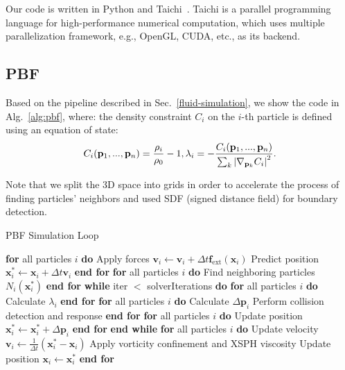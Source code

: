 \documentclass[sigconf]{acmart}
\begin{document}
Our code is written in Python and Taichi~\cite{hu2019taichi, hu2019difftaichi, hu2021quantaichi}. Taichi is a parallel programming language for high-performance numerical computation, which uses multiple parallelization framework, e.g., OpenGL, CUDA, etc., as its backend.

\subsection{PBF}
Based on the pipeline described in Sec.~\ref{fluid-simulation}, we show the code in Alg.~\ref{alg:pbf}, where:
the density constraint $C_i$ on the $i$-th particle is defined using an equation of state: 
 \begin{equation}
     C_{i}(\mathbf{p}_{1},...,\mathbf{p}_{n})=\frac{\rho_{i}}{\rho_{0}}-1, \\
     \lambda_{i}=-\frac{C_{i}(\mathbf{p}_{1},...,\mathbf{p}_{n})}{\sum_{k}\left|\nabla_{{\mathbf{p}_{k}}}C_{i}\right|^{2}}.
 \end{equation}
 
Note that we split the 3D space into grids in order to accelerate the process of finding particles' neighbors and used SDF (signed distance field) for boundary detection.
\begin{algorithm}
\caption{PBF Simulation Loop}
\begin{algorithmic}[1]
\State \textbf{for} all particles $i$ \textbf{do}
\State \quad Apply forces $\mathbf{v}_i \leftarrow \mathbf{v}_i + \Delta t \mathbf{f}_{\text{ext}}(\mathbf{x}_i)$ 
\State \quad Predict position $\mathbf{x}^*_i \leftarrow \mathbf{x}_i + \Delta t \mathbf{v}_i$
\State \textbf{end for}
\State \textbf{for} all particles $i$ \textbf{do}
\State \quad Find neighboring particles $N_i(\mathbf{x}^*_i)$
\State \textbf{end for}
\State \textbf{while} iter $<$ solverIterations \textbf{do} 
\State \quad \textbf{for} all particles $i$ \textbf{do}
\State \quad \quad Calculate $\lambda_i$
\State \quad \textbf{end for}
\State \quad \textbf{for} all particles $i$ \textbf{do}
\State \quad \quad Calculate $\Delta \mathbf{p}_i$
\State \quad \quad Perform collision detection and response
\State \quad \textbf{end for}
\State \quad \textbf{for} all particles $i$ \textbf{do}
\State \quad \quad Update position $\mathbf{x}^*_i \leftarrow \mathbf{x}^*_i + \Delta \mathbf{p}_i$
\State \quad \textbf{end for}
\State \textbf{end while}
\State \textbf{for} all particles $i$ \textbf{do}
\State \quad Update velocity $\mathbf{v}_i \leftarrow \frac{1}{\Delta t} (\mathbf{x}^*_i - \mathbf{x}_i)$
\State \quad Apply vorticity confinement and XSPH viscosity
\State \quad Update position $\mathbf{x}_i \leftarrow \mathbf{x}^*_i$
\State \textbf{end for}
\end{algorithmic}
\label{alg:pbf}
\end{algorithm}
\end{document}
